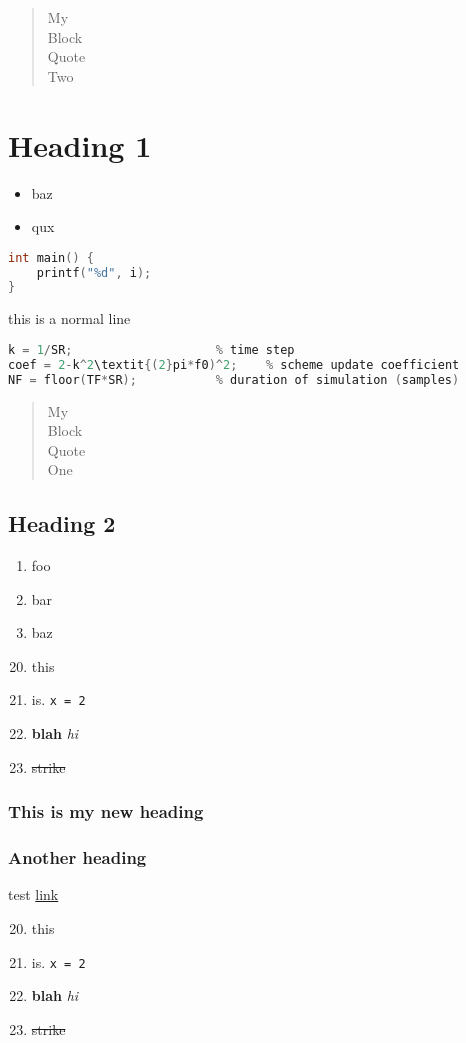 \documentclass{article}
\begin{document}
 
    \setcounter{secnumdepth}{0}

    
\begin{quote}
My\\
Block\\
Quote\\
Two
\end{quote}

\section{Heading 1}
\begin{itemize}
    \item baz
    \item qux
\end{itemize}

\begin{lstlisting}[language=c, style=myStyle]
int main() {
    printf("%d", i);
}
\end{lstlisting}

this is a normal line

\begin{lstlisting}[language=c, style=myStyle]
% derived parameters
k = 1/SR;                    % time step
coef = 2-k^2\textit{(2}pi*f0)^2;    % scheme update coefficient
NF = floor(TF*SR);           % duration of simulation (samples)
\end{lstlisting}

\begin{quote}
My\\
Block\\
Quote\\
One
\end{quote}

\subsection{Heading 2}
\begin{enumerate}
    \setcounter{enumi}{0}
    \item foo
    \item bar
    \item baz
\end{enumerate}

\begin{enumerate}
    \setcounter{enumi}{19}
    \item this
    \item is. \verb|x = 2|
    \item \textbf{blah} \textit{hi}
    \item \sout{strike}
\end{enumerate}

\subsubsection{This is my new heading}
\subsubsection{Another heading}
test \href{https://duckduckgo.com}{link}

\begin{enumerate}
    \setcounter{enumi}{19}
    \item this
    \item is. \verb|x = 2|
    \item \textbf{blah} \textit{hi}
    \item \sout{strike}
\end{enumerate}
\end{document}
